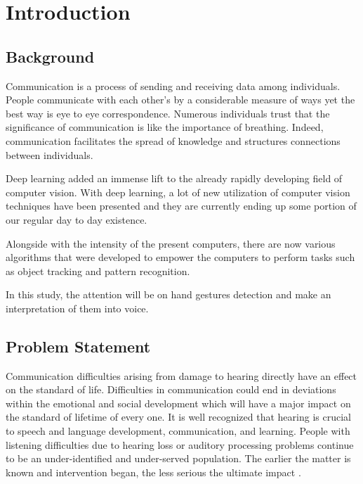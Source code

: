 \documentclass[12pt]{report}
\begin{document}
\setcounter{page}{2} 
\renewcommand{\contentsname}{Table of Contents}
\tableofcontents
\listoffigures
\listoftables
\newpage

\chapter{Introduction} 

\section{Background}
Communication is a process of sending and receiving data among individuals. 
People communicate with each other's by a considerable measure of ways yet 
the best way is eye to eye correspondence. Numerous individuals trust that 
the significance of communication is like the importance of breathing. Indeed, 
communication facilitates the spread of knowledge and structures connections 
between individuals. 

Deep learning added an immense lift to the already rapidly developing field 
of computer vision. With deep learning, a lot of new utilization of computer
vision techniques have been presented and they are currently ending up some 
portion of our regular day to day existence.

Alongside with the intensity of the present computers, there are now various 
algorithms that were developed to empower the computers to perform tasks such 
as object tracking and pattern recognition. 

In this study, the attention will be on hand gestures detection and make an 
interpretation of them into voice.

\section{Problem Statement}
Communication difficulties arising from damage to hearing
directly have an effect on the standard of life. Difficulties in 
communication could end in deviations within the emotional and 
social development which will have a major impact on the standard of
lifetime of every one. It is well recognized that hearing is crucial 
to speech and language development, communication, and learning. People
with listening difficulties due to hearing loss or auditory processing 
problems continue to be an under-identified and under-served population.
The earlier the matter is known and intervention began, the less
serious the ultimate impact \cite{AFrajtag12017}.
\end{document}

